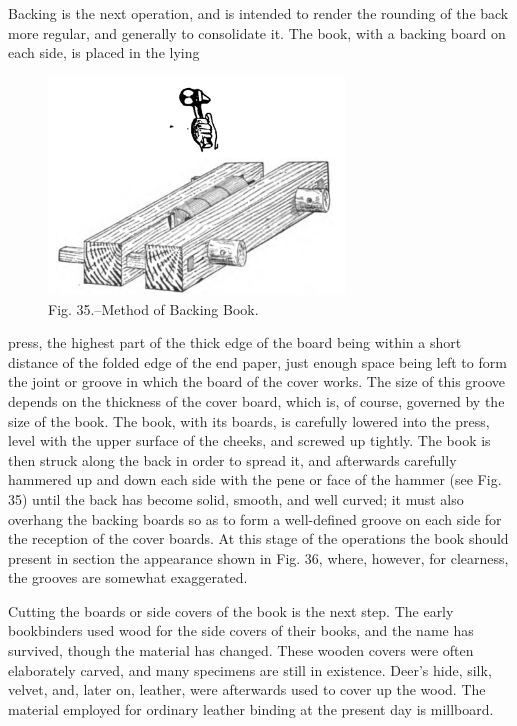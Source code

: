 \documentclass[twoside]{book}
\begin{document}
Backing is the next operation, and is intended
to render the rounding of the back more regular,
and generally to consolidate it. The book, with a
backing board on each side, is placed in the lying
	\begin{figure}[h]
		\centering
		\includegraphics[width=0.7\textwidth]{Figures/_035.png}
		\caption*{Fig. 35.--Method of Backing Book.}
	\end{figure}
press, the highest part of the thick edge of the
board being within a short distance of the folded
edge of the end paper, just enough space being left
to form the joint or groove in which the board of
the cover works. The size of this groove depends
on the thickness of the cover board, which is, of
course, governed by the size of the book. The book,
with its boards, is carefully lowered into the press,
level with the upper surface of the cheeks, and
screwed up tightly. The book is then struck along
the back in order to spread it, and afterwards
carefully hammered up and down each side with the
\pagebreak
pene or face of the hammer (see Fig. 35) until the
back has become solid, smooth, and well curved;
it must also overhang the backing boards so as to
form a well-defined groove on each side for the
reception of the cover boards. At this stage of the
operations the book should present in section the
appearance shown in Fig. 36, where, however, for
clearness, the grooves are somewhat exaggerated.

Cutting the boards or side covers of the book is
the next step. The early bookbinders used wood
for the side covers of their books, and the name
has survived, though the material has changed.
These wooden covers were often elaborately carved,
and many specimens are still in existence. Deer's
hide, silk, velvet, and, later on, leather, were
afterwards used to cover up the wood. The material
employed for ordinary leather binding at the present
day is millboard.
\end{document}
